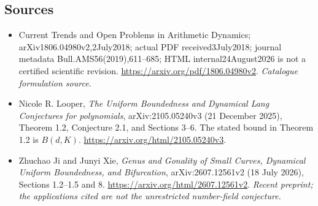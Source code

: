 \documentclass[11pt,a4paper]{article}
\begin{document}
\subsection{Sources}
\begin{itemize}\raggedright
\item[\textnormal{[S1]}]\hypertarget{source:212:1}{} Current Trends and Open Problems in Arithmetic Dynamics; arXiv1806.04980v2,2July2018; actual PDF received3July2018; journal metadata Bull.AMS56(2019),611–685; HTML internal24August2026 is not a certified scientific revision.
\url{https://arxiv.org/pdf/1806.04980v2}.
{\small\textit{Catalogue formulation source.}}
\item[\textnormal{[E1]}]\hypertarget{extra:212:1}{} Nicole R. Looper,
\emph{The Uniform Boundedness and Dynamical Lang Conjectures for polynomials},
arXiv:2105.05240v3 (21 December 2025), Theorem 1.2, Conjecture 2.1, and
Sections 3--6. The stated bound in Theorem 1.2 is $B(d,K)$.
\url{https://arxiv.org/html/2105.05240v3}.
\item[\textnormal{[E2]}]\hypertarget{extra:212:2}{} Zhuchao Ji and Junyi Xie,
\emph{Genus and Gonality of Small Curves, Dynamical Uniform Boundedness, and Bifurcation},
arXiv:2607.12561v2 (18 July 2026), Sections 1.2--1.5 and 8.
\url{https://arxiv.org/html/2607.12561v2}.
{\small\textit{Recent preprint; the applications cited are not the unrestricted number-field conjecture.}}
\end{itemize}
\end{document}
